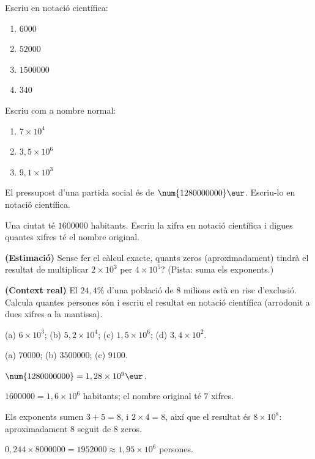 \begin{exercicis}
\begin{exlist}
  \item Escriu en notació científica:
        \begin{enumerate}[label=\alph*), leftmargin=1.6em, topsep=2pt]
          \item $\num{6000}$ \hfill \item $\num{52000}$ \hfill \item $\num{1500000}$
          \hfill \item $\num{340}$
        \end{enumerate}
  \item Escriu com a nombre normal:
        \begin{enumerate}[label=\alph*), leftmargin=1.6em, topsep=2pt]
          \item $7\times 10^{4}$ \hfill \item $3,5\times 10^{6}$ \hfill
          \item $9,1\times 10^{3}$
        \end{enumerate}
  \item El pressupost d'una partida social és de $\num{1280000000}\eur$. Escriu-lo en
        notació científica.
  \item Una ciutat té $\num{1600000}$ habitants. Escriu la xifra en notació
        científica i digues quantes xifres té el nombre original.
  \item \textbf{(Estimació)} Sense fer el càlcul exacte, quants zeros (aproximadament)
        tindrà el resultat de multiplicar $2\times 10^{3}$ per $4\times 10^{5}$? (Pista:
        suma els exponents.)
  \item \textbf{(Context real)} El $24,4\%$ d'una població de $8$ milions està en risc
        d'exclusió. Calcula quantes persones són i escriu el resultat en notació
        científica (arrodonit a dues xifres a la mantissa).
\end{exlist}
\end{exercicis}

\begin{solucions}
\begin{sollist}
  \item (a) $6\times 10^{3}$; \quad (b) $5,2\times 10^{4}$; \quad
        (c) $1,5\times 10^{6}$; \quad (d) $3,4\times 10^{2}$.
  \item (a) $\num{70000}$; \quad (b) $\num{3500000}$; \quad (c) $\num{9100}$.
  \item $\num{1280000000}=1,28\times 10^{9}\eur$.
  \item $\num{1600000}=1,6\times 10^{6}$ habitants; el nombre original té $7$ xifres.
  \item Els exponents sumen $3+5=8$, i $2\times 4=8$, així que el resultat és
        $8\times 10^{8}$: aproximadament $8$ seguit de $8$ zeros.
  \item $0,244\times\num{8000000}=\num{1952000}\approx 1,95\times 10^{6}$ persones.
\end{sollist}
\end{solucions}
